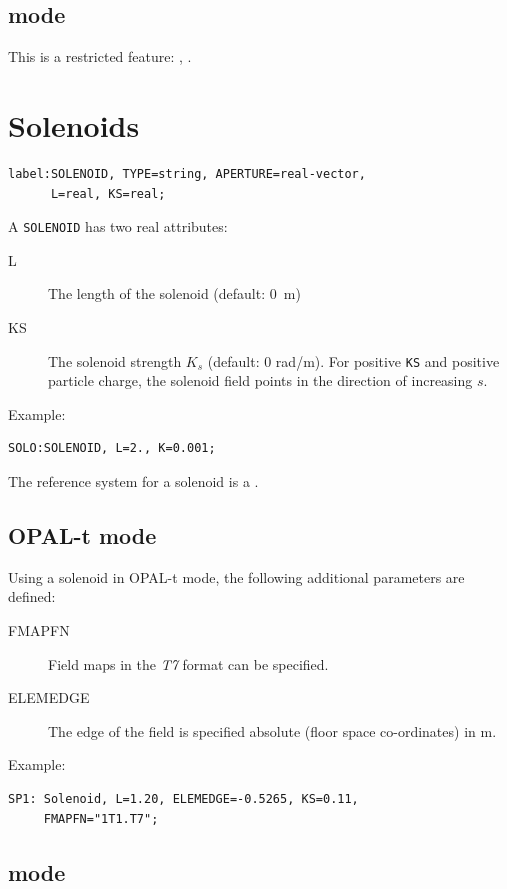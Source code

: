 \subsection{\opalcycl mode}

This is a restricted feature: \noopalt, \noopalcycl .

\section{Solenoids}
\label{sec:solenoid}
\begin{verbatim}
label:SOLENOID, TYPE=string, APERTURE=real-vector,
      L=real, KS=real;
\end{verbatim}
A \texttt{SOLENOID} has two real attributes:
\begin{description}
\item[L]
  The length of the solenoid (default: 0~m)
\item[KS]
  The solenoid strength $K_s$ (default: 0 rad/m).
  For positive \texttt{KS} and positive particle charge,
  the solenoid field points in the direction of increasing $s$.
\end{description}
\noindent Example:
\begin{verbatim}
SOLO:SOLENOID, L=2., K=0.001;
\end{verbatim}
The reference system for a solenoid is a 
.

\subsection{OPAL-t mode}
\label{sec:solenoid-t}
Using a solenoid in OPAL-t mode, the following additional parameters are defined:
\begin{description}
\item[FMAPFN]
  Field maps in the {\em T7} format can be specified.
\item[ELEMEDGE]
  The edge of the field is specified absolute (floor space co-ordinates) in m.
  \end{description}
\noindent Example:
\begin{verbatim}
SP1: Solenoid, L=1.20, ELEMEDGE=-0.5265, KS=0.11,
     FMAPFN="1T1.T7"; 
\end{verbatim}

\subsection{\opalcycl mode}

